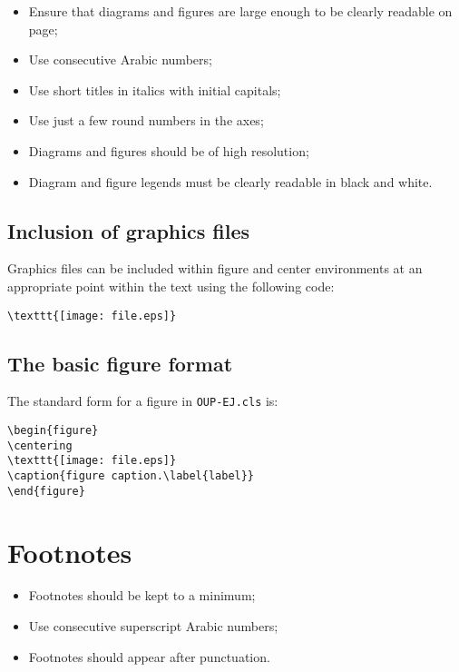 \documentclass{OUP-EJ}
\begin{document}
\begin{itemize}
\item Ensure that diagrams and figures are large enough to be clearly readable on page;
\item Use consecutive Arabic numbers;

\item Use short titles in italics with initial capitals;
\item Use just a few round numbers in the axes;
\item Diagrams and figures should be of high resolution;
\item Diagram and figure legends must be clearly readable in black and white.
\end{itemize}



\subsection{Inclusion of graphics files\label{figinc}}
Graphics files can
be included within figure and center environments at an
appropriate point within the text using the following code:
\small\begin{verbatim}
\texttt{[image: file.eps]}
\end{verbatim}\normalsize


\clearpage

\subsection{The basic figure format}
The standard form for a figure in \verb"OUP-EJ.cls" is:
\small\begin{verbatim}
\begin{figure}
\centering
\texttt{[image: file.eps]}
\caption{figure caption.\label{label}}
\end{figure}
\end{verbatim}\normalsize



\section{Footnotes}

\begin{itemize}
\item Footnotes should be kept to a minimum;
\item Use consecutive superscript Arabic numbers;
\item Footnotes should appear after punctuation.
\end{itemize}
\end{document}
